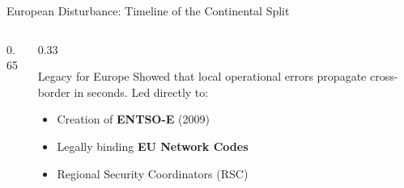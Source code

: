 \begin{frame}{European Disturbance: Timeline of the Continental Split}
\begin{columns}[T]
\begin{column}{0.65\textwidth}
\end{column}
\begin{column}{0.33\textwidth}
    \begin{alertblock}{Legacy for Europe}
    \scriptsize
    Showed that local operational errors propagate cross-border in seconds. Led directly to:
    \begin{itemize}\setlength{\itemsep}{1pt}
        \tiny
        \item Creation of \textbf{ENTSO-E} (2009)
        \item Legally binding \textbf{EU Network Codes}
        \item Regional Security Coordinators (RSC)
    \end{itemize}
    \end{alertblock}
\end{column}
\end{columns}
\end{frame}

